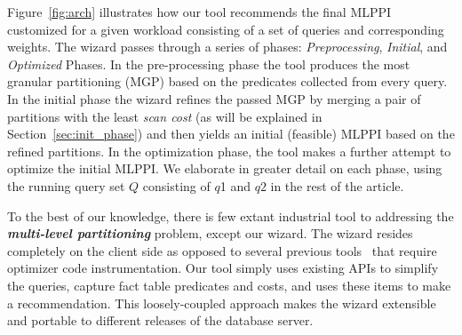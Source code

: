 \documentclass[runningheads]{comsis2}
\begin{document}
Figure~\ref{fig:arch} illustrates how our tool recommends 
the final MLPPI customized for a given workload consisting of 
a set of queries and corresponding weights. 
The wizard passes through a series of phases: {\em Preprocessing}, 
{\em Initial}, and {\em Optimized} Phases. 
In the pre-processing phase the tool produces the most granular partitioning (MGP) based on the predicates collected from every query.
In the initial phase the wizard refines the passed MGP 
by merging a pair of partitions with the least {\em scan cost} (as will be explained in \hbox{Section~\ref{sec:init_phase}}) 
and then yields an initial (feasible) MLPPI based on the refined partitions.
In the \hbox{optimization} phase, the tool makes a further attempt to optimize the initial MLPPI. 
We elaborate in greater detail on each phase, 
using the running query set $Q$ consisting of $q$1 and $q2$ in the rest of the article.

%
%

To the best of our knowledge, there is few extant industrial tool 
to addressing the {\it {\bf \hbox{multi-level} partitioning}} problem, except our wizard. 
The wizard resides completely on the client side as opposed to 
several previous tools~\cite{agrawal04:integrating,Lightstone04:db2auto,nehme2011automated} 
that require optimizer code instrumentation. 
Our tool simply uses existing APIs to simplify the queries, capture fact table 
predicates and costs, and uses these items to make a recommendation. 
This \hbox{loosely-coupled} approach makes the wizard extensible and portable to different releases 
of the database server. 
\end{document}
